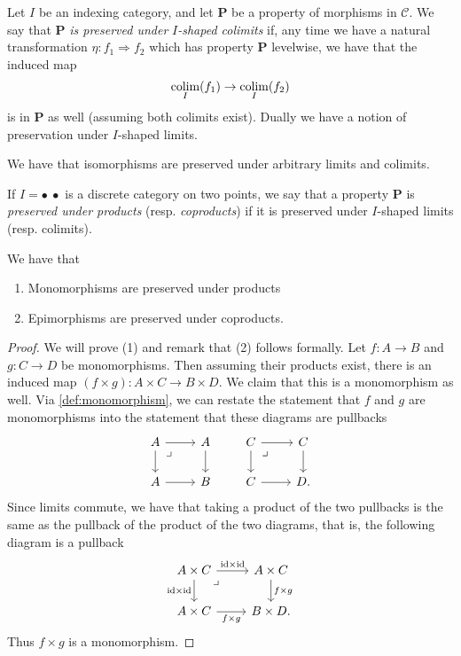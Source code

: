 \begin{definition}\label{def:colimit-preserve-property} Let $I$ be an indexing category, and let \textbf{P} be a property of morphisms in $\mathscr{C}$. We say that \textbf{P} \textit{is preserved under} $I$\textit{-shaped colimits} if, any time we have a natural transformation $\eta: f_1 \Rightarrow f_2$ which has property \textbf{P} levelwise, we have that the induced map
\begin{align*}
    \mathop{\operatorname*{colim}}_I(f_1) \to \mathop{\operatorname*{colim}}_I(f_2)
\end{align*}
is in \textbf{P} as well (assuming both colimits exist). Dually we have a notion of preservation under $I$-shaped limits.
\end{definition}

\begin{example} We have that isomorphisms are preserved under arbitrary limits and colimits.
\end{example}

\begin{example} If $I = \bullet\ \bullet$ is a discrete category on two points, we say that a property \textbf{P} is \textit{preserved under products} (resp. \textit{coproducts}) if it is preserved under $I$-shaped limits (resp. colimits).
\end{example}

\begin{proposition}\label{prop:monos-preserved-under-products} We have that
\begin{enumerate}
    \item Monomorphisms are preserved under products
    \item Epimorphisms are preserved under coproducts.
\end{enumerate}
\end{proposition}
\begin{proof} We will prove (1) and remark that (2) follows formally. Let $f: A \to B$ and $g: C \to D$ be monomorphisms. Then assuming their products exist, there is an induced map $(f \times g) : A \times C \to B \times D$. We claim that this is a monomorphism as well. Via \autoref{def:monomorphism}, we can restate the statement that $f$ and $g$ are monomorphisms into the statement that these diagrams are pullbacks
\[ \begin{tikzcd}
    A\rar\dar\pb & A\dar\\
    A\rar & B
\end{tikzcd} \quad\quad  \begin{tikzcd}
    C\rar\dar\pb & C\dar\\
    C\rar & D.
\end{tikzcd} \]
Since limits commute, we have that taking a product of the two pullbacks is the same as the pullback of the product of the two diagrams, that is, the following diagram is a pullback
\[ \begin{tikzcd}
    A \times C\rar["\id \times \id"]\dar["\id \times \id" left]\pb & A \times C\dar["f \times g" right]\\
    A \times C \rar["f \times g" below] & B \times D.
\end{tikzcd} \]
Thus $f \times g$ is a monomorphism.
\end{proof}



